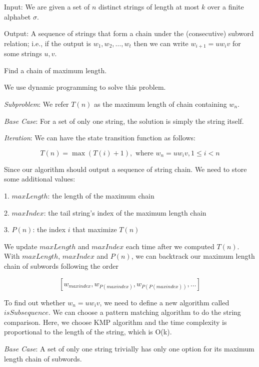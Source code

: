 \newpage
{} %

\problemdes

Input: We are given a set of $n$ distinct strings of length at most $k$ over a finite alphabet $\sigma$.

Output: A sequence of strings that form a chain under the (consecutive) subword relation; i.e., if the output is $w_{1}, w_{2}, \dots, w_{t}$ then we can write $w_{i+1}=u w_{i} v$ for some strings $u,v$.

Find a chain of maximum length.

\solution


We use dynamic programming to solve this problem. 

\textit{Subproblem}: We refer $T(n)$ as the maximum length of chain containing $w_n$. 

\textit{Base Case}: For a set of only one string, the solution is simply the string itself.

\textit{Iteration}: We can have the state transition function as follows:

$$T(n) = \max(T(i) + 1), \text{ where }w_{n}=u w_{i} v, 1\leq i <n$$

Since our algorithm should output a sequence of string chain. We need to store some additional values:

1. $maxLength$: the length of the maximum chain

2. $maxIndex$: the tail string's index of the maximum length chain

3. $P(n)$: the index $i$ that maximize $T(n)$

We update $maxLength$ and $maxIndex$ each time after we computed $T(n)$. With $maxLength$, $maxIndex$ and $P(n)$, we can backtrack our maximum length chain of subwords following the order

$$[w_{maxindex}, w_{P(maxindex)}, w_{P(P(maxindex))}, \dots]$$

To find out whether $w_{n}=u w_{i} v$, we need to define a new algorithm called $isSubsequence$. We can choose a pattern matching algorithm to do the string comparison. Here, we choose KMP algorithm and the time complexity is proportional to the length of the string, which is O(k).




\textit{Base Case}: A set of only one string trivially has only one option for its maximum length chain of subwords.

